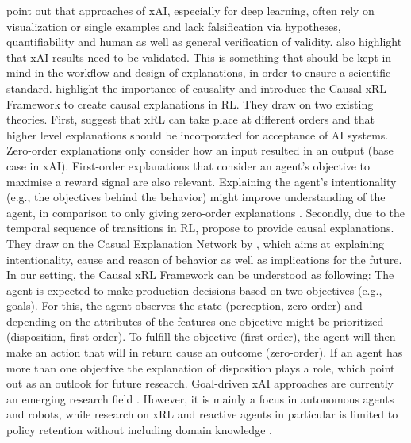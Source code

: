  point out that approaches of xAI, especially for deep learning, often rely on visualization or single examples and lack falsification via hypotheses, quantifiability and human as well as general verification of validity.  also highlight that xAI results need to be validated. This is something that should be kept in mind in the workflow and design of explanations, in order to ensure a scientific standard.
 highlight the importance of causality and introduce the Causal xRL Framework to create causal explanations in RL. They draw on two existing theories.
First,  suggest that xRL can take place at different orders and that higher level explanations should be incorporated for acceptance of AI systems. Zero-order explanations only consider how an input resulted in an output (base case in xAI). First-order explanations that consider an agent’s objective to maximise a reward signal are also relevant. Explaining the agent's intentionality (e.g., the objectives behind the behavior) might improve understanding of the agent, in comparison to only giving zero-order explanations .
Secondly, due to the temporal sequence of transitions in RL,  propose to provide causal explanations. They draw on the Casual Explanation Network by  , which aims at explaining intentionality, cause and reason of behavior as well as implications for the future.
In our setting, the Causal xRL Framework can be understood as following: The agent is expected to make production decisions based on two objectives (e.g., goals). For this, the agent observes the state (perception, zero-order) and depending on the attributes of the features one objective might be prioritized (disposition, first-order). To fulfill the objective (first-order), the agent will then make an action that will in return cause an outcome (zero-order).
If an agent has more than one objective the explanation of disposition plays a role, which  point out as an outlook for future research.
Goal-driven xAI approaches are currently an emerging research field . However, it is mainly a focus in autonomous agents and robots, while research on xRL and reactive agents in particular is limited to policy retention without including domain knowledge .
